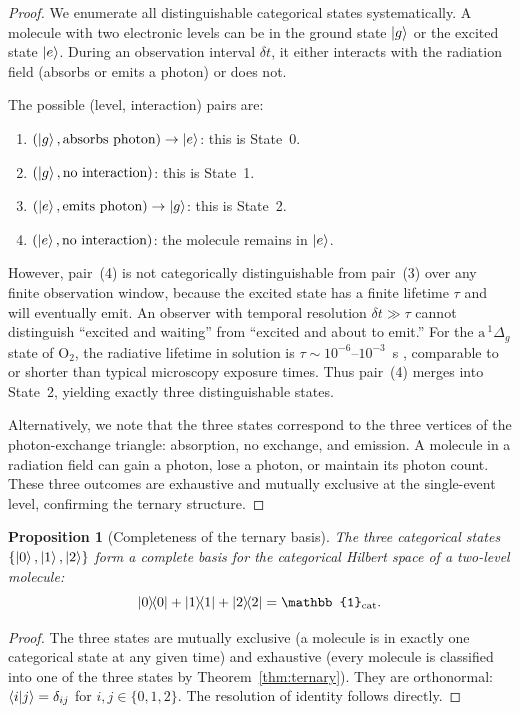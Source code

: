 \documentclass[11pt,twocolumn,a4paper]{article}
\newtheorem{proposition}[theorem]{Proposition}
\begin{document}
\begin{proof}
We enumerate all distinguishable categorical states systematically.
A molecule with two electronic levels can be in the ground state $\ket{g}$ or the excited state $\ket{e}$.
During an observation interval $\delta t$, it either interacts with the radiation field (absorbs or emits a photon) or does not.

The possible (level, interaction) pairs are:
\begin{enumerate}
\item $(\ket{g}, \text{absorbs photon}) \to \ket{e}$: this is State~0.
\item $(\ket{g}, \text{no interaction})$: this is State~1.
\item $(\ket{e}, \text{emits photon}) \to \ket{g}$: this is State~2.
\item $(\ket{e}, \text{no interaction})$: the molecule remains in $\ket{e}$.
\end{enumerate}

However, pair~(4) is not categorically distinguishable from pair~(3) over any finite observation window, because the excited state has a finite lifetime $\tau$ and will eventually emit.
An observer with temporal resolution $\delta t \gg \tau$ cannot distinguish ``excited and waiting'' from ``excited and about to emit.''
For the $\mathrm{a}\,^1\Delta_g$ state of O$_2$, the radiative lifetime in solution is $\tau \sim 10^{-6}$--$10^{-3}$~s \citep{Schweitzer2003}, comparable to or shorter than typical microscopy exposure times.
Thus pair~(4) merges into State~2, yielding exactly three distinguishable states.

Alternatively, we note that the three states correspond to the three vertices of the photon-exchange triangle: absorption, no exchange, and emission.
A molecule in a radiation field can gain a photon, lose a photon, or maintain its photon count.
These three outcomes are exhaustive and mutually exclusive at the single-event level, confirming the ternary structure.
\end{proof}

\begin{proposition}[Completeness of the ternary basis]\label{prop:ternary_complete}
The three categorical states $\{\ket{0}, \ket{1}, \ket{2}\}$ form a complete basis for the categorical Hilbert space of a two-level molecule:
\begin{equation}\label{eq:ternary_complete}
\ketbra{0}{0} + \ketbra{1}{1} + \ketbra{2}{2} = \mathbb{1}_{\mathrm{cat}}.
\end{equation}
\end{proposition}
\begin{proof}
The three states are mutually exclusive (a molecule is in exactly one categorical state at any given time) and exhaustive (every molecule is classified into one of the three states by Theorem~\ref{thm:ternary}).
They are orthonormal: $\braket{i}{j} = \delta_{ij}$ for $i, j \in \{0, 1, 2\}$.
The resolution of identity follows directly.
\end{proof}
\end{document}
